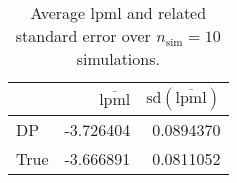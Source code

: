 \begin{table}[H]

\caption{Average lpml and related standard error over $n_{\text{sim}} = 10$ simulations.}
\centering
\begin{tabular}[t]{lrr}
\toprule
  & $\overbar{\text{lpml}}$ & $\text{sd}(\overbar{\text{lpml}})$\\
\midrule
DP & -3.726404 & 0.0894370\\
True & -3.666891 & 0.0811052\\
\bottomrule
\end{tabular}
\end{table}